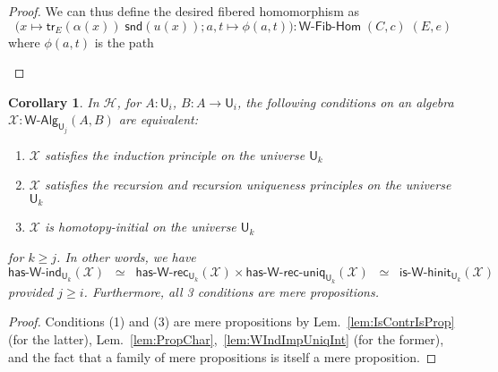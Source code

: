 \documentclass[reqno,10pt,a4paper,oneside]{amsart}
\numberwithin{equation}{section}
\theoremstyle{mythm}
\newtheorem{corollary}[theorem]{Corollary}
\theoremstyle{mydef}
\theoremstyle{myrmk}
\newcommand{\Hint}{\mathcal{H}}
\newcommand{\trans}{\mathsf{tr}}
\newcommand{\ct}{%
  \mathchoice{\mathbin{\raisebox{0.5ex}{$\displaystyle\centerdot$}}}%
             {\mathbin{\raisebox{0.5ex}{$\centerdot$}}}%
             {\mathbin{\raisebox{0.25ex}{$\scriptstyle\,\centerdot\,$}}}%
             {\mathbin{\raisebox{0.1ex}{$\scriptscriptstyle\,\centerdot\,$}}}}
\newcommand{\funext}{\leftidx{^\Pi}{\mathsf{Eq}}^{=}}
\newcommand{\happly}{\leftidx{^=}{\mathsf{Eq}}^{\Pi}}
\newcommand{\idtodpair}{\leftidx{^=}{\mathsf{Eq}}^{\Sigma}}
\newcommand{\lam}[1]{\lambda_{#1}}
\newcommand{\fst}{\mathsf{fst}}
\newcommand{\snd}{\mathsf{snd}}
\newcommand{\app}{\mathsf{ap}}
\newcommand{\refl}{\mathsf{refl}}
\newcommand{\W}{\mathsf{W}}
\newcommand{\UU}{\mathsf{U}}
\newcommand{\WAlg}{\mathsf{W}\text{-}\mathsf{Alg}}
\newcommand{\WFibHom}{\mathsf{W}\text{-}\mathsf{Fib}\text{-}\mathsf{Hom}}
\newcommand{\HasWRec}{\mathsf{has}\text{-}\mathsf{W}\text{-}\mathsf{rec}}
\newcommand{\HasWInd}{\mathsf{has}\text{-}\mathsf{W}\text{-}\mathsf{ind}}
\newcommand{\HasWRecUniq}{\mathsf{has}\text{-}\mathsf{W}\text{-}\mathsf{rec}\text{-}\mathsf{uniq}}
\newcommand{\IsWHInit}{\mathsf{is}\text{-}\mathsf{\W}\text{-}\mathsf{hinit}}
\newcommand{\X}{\mathcal{X}}
\begin{document}
\begin{proof}
We can thus define the desired fibered homomorphism as \[\Big(x \mapsto \trans_E(\alpha(x)) \; \snd(u(x)); a,t \mapsto \phi(a,t) \Big) : \WFibHom \; (C,c) \; (E,e)\]
where $\phi(a,t)$ is the path
\begin{center}
\end{center}
\end{proof}

\begin{corollary}\label{lem:WMainInt}
In $\Hint$, for $A:\UU_i$, $B : A \to \UU_i$, the following conditions on an algebra $\X : \WAlg_{\UU_j}(A,B)$ are equivalent:
\begin{enumerate}
\item $\X$ satisfies the induction principle on the universe $\UU_k$
\item $\X$ satisfies the recursion and recursion uniqueness principles on the universe $\UU_k$
\item $\X$ is homotopy-initial on the universe $\UU_k$  
\end{enumerate}
for $k \geq j$. In other words, we have \[ \HasWInd_{\UU_k}(\X)  \;\; \simeq \;\; \HasWRec_{\UU_k}(\X) \times \HasWRecUniq_{\UU_k}(\X) \;\; \simeq \;\; \IsWHInit_{\UU_k}(\X) \]
provided $j \geq i$. Furthermore, all 3 conditions are mere propositions.
\end{corollary}
\begin{proof}
Conditions (1) and (3) are mere propositions by Lem.~\ref{lem:IsContrIsProp} (for the latter), Lem.~\ref{lem:PropChar},~\ref{lem:WIndImpUniqInt} (for the former), and the fact that a family of mere propositions is itself a mere proposition.
\end{proof}
\end{document}
